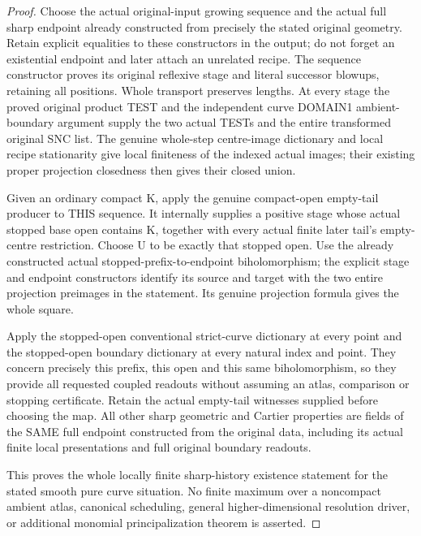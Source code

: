 \begin{proof}
Choose the actual original-input growing sequence and the actual full
sharp endpoint already constructed from precisely the stated original
geometry. Retain explicit equalities to these constructors in the output;
do not forget an existential endpoint and later attach an unrelated
recipe. The sequence constructor proves its original reflexive stage and
literal successor blowups, retaining all positions. Whole transport
preserves lengths. At every stage the proved original product TEST and
the independent curve DOMAIN1 ambient-boundary argument supply the two
actual TESTs and the entire transformed original SNC list. The genuine
whole-step centre-image dictionary and local recipe stationarity give
local finiteness of the indexed actual images; their existing proper
projection closedness then gives their closed union.

Given an ordinary compact K, apply the genuine compact-open empty-tail
producer to THIS sequence. It internally supplies a positive stage whose
actual stopped base open contains K, together with every actual finite
later tail's empty-centre restriction. Choose U to be exactly that stopped
open. Use the already constructed actual stopped-prefix-to-endpoint
biholomorphism; the explicit stage and endpoint constructors identify its
source and target with the two entire projection preimages in the
statement. Its genuine projection formula gives the whole square.

Apply the stopped-open conventional strict-curve dictionary at every
point and the stopped-open boundary dictionary at every natural index
and point. They concern precisely this prefix, this open and this same
biholomorphism, so they provide all requested coupled readouts without
assuming an atlas, comparison or stopping certificate. Retain the actual
empty-tail witnesses supplied before choosing the map. All other sharp
geometric and Cartier properties are fields of the SAME full endpoint
constructed from the original data, including its actual finite local
presentations and full original boundary readouts.

This proves the whole locally finite sharp-history existence statement
for the stated smooth pure curve situation. No finite maximum over a
noncompact ambient atlas, canonical scheduling, general higher-dimensional
resolution driver, or additional monomial principalization theorem is
asserted.
\end{proof}
